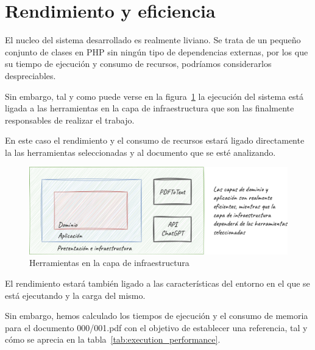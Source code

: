 \section{Rendimiento y eficiencia}

El nucleo del sistema desarrollado es realmente liviano.
Se trata de un pequeño conjunto de clases en PHP sin ningún tipo de dependencias externas, por los que su tiempo de
ejecución y consumo de recursos, podríamos considerarlos despreciables.

Sin embargo, tal y como puede verse en la figura~\ref{fig:chapter_5.2.performance}
la ejecución del sistema está ligada a las herramientas en la capa de infraestructura que son las finalmente
responsables de realizar el trabajo.

En este caso el rendimiento y el consumo de recursos estará ligado directamente la las herramientas seleccionadas y al
documento que se esté analizando.

\begin{figure}[ht]
    \begin{center}
        \includegraphics[width=\textwidth]{./chapter/5/images/chapter_5.2.performance}
        \caption{Herramientas en la capa de infraestructura}
        \label{fig:chapter_5.2.performance}
    \end{center}
\end{figure}



El rendimiento estará también ligado a las características del entorno en el que se está ejecutando y la carga del
mismo.

Sin embargo, hemos calculado los tiempos de ejecución y el consumo de memoria para el documento 000/001.pdf con el
objetivo de establecer una referencia, tal y cómo se aprecia en la tabla~\ref{tab:execution_performance}.

